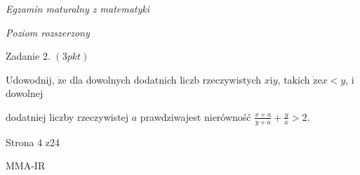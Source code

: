 \documentclass[a4paper,12pt]{article}
\begin{document}
{\it Egzamin maturalny z matematyki}

{\it Poziom rozszerzony}

Zadanie 2. $(3pkt)$

Udowodnij, $\dot{\mathrm{z}}\mathrm{e}$ dla dowolnych dodatnich liczb rzeczywistych $x\mathrm{i}y$, takich $\dot{\mathrm{z}}\mathrm{e}x<y$, i dowolnej

dodatniej liczby rzeczywistej $a$ prawdziwajest nierówność $\displaystyle \frac{x+a}{y+a}+\frac{y}{x}>2.$

Strona 4 z24

MMA-IR
\end{document}
